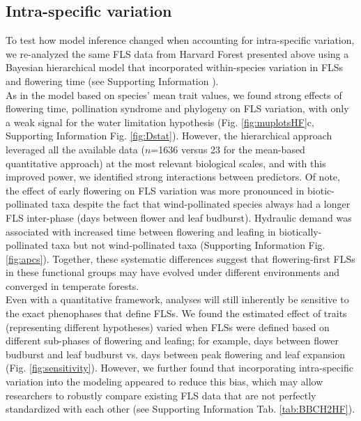 \documentclass[11pt]{article}
\begin{document}
\subsection*{Intra-specific variation}
\noindent To test how model inference changed when accounting for intra-specific variation, we re-analyzed the same FLS data from Harvard Forest presented above using a Bayesian hierarchical model that incorporated within-species variation in FLSs and flowering time (see Supporting Information ).\\

\noindent As in the model based on species' mean trait values, we found strong effects of flowering time, pollination syndrome and phylogeny on FLS variation, with only a weak signal for the water limitation  hypothesis (Fig. \ref{fig:muplotsHF}c, Supporting Information Fig. \ref{fig:Dstat}). However, the hierarchical approach leveraged all the available data ($n$=1636 versus 23 for the mean-based quantitative approach) at the most relevant biological scales, and with this improved power, we identified strong interactions between predictors. Of note, the effect of early flowering on FLS variation was more pronounced in biotic-pollinated taxa despite the fact that wind-pollinated species always had a longer FLS inter-phase (days between flower and leaf budburst). Hydraulic demand  was associated with increased time between flowering and leafing in biotically-pollinated taxa but not wind-pollinated taxa (Supporting Information Fig. \ref{fig:apcs}). Together, these systematic differences suggest that flowering-first FLSs in these functional groups may have evolved under different environments and converged in temperate forests.\\%

\noindent Even with a quantitative framework, analyses will still inherently be sensitive to the exact phenophases that define FLSs. We found the estimated effect of traits (representing different hypotheses) varied when FLSs were defined based on different sub-phases of flowering and leafing; for example, days between flower budburst and leaf budburst vs. days between peak flowering and leaf expansion (Fig. \ref{fig:sensitivity}). However, we further found that incorporating intra-specific variation into the modeling appeared to reduce this bias, which may allow researchers to robustly compare existing FLS data  that are not perfectly standardized with each other (see Supporting Information Tab. \ref{tab:BBCH2HF}).\\
\end{document}
